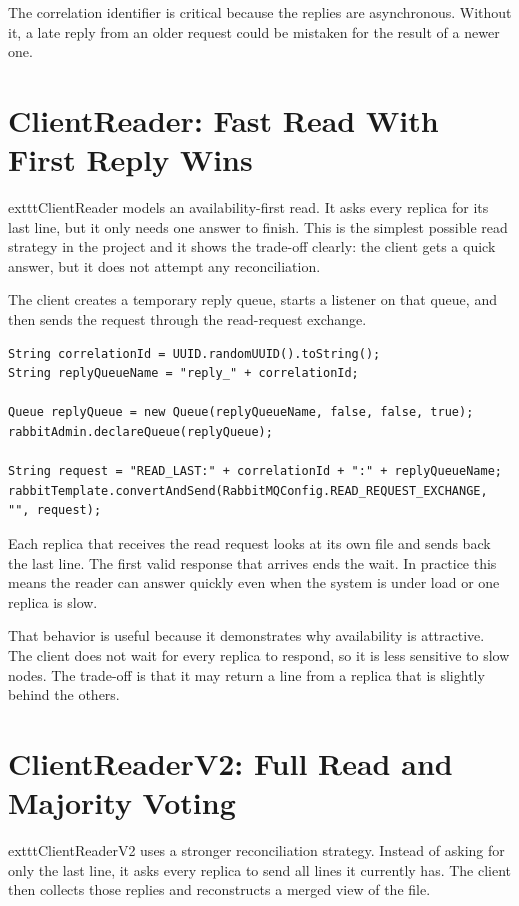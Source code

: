 \documentclass[11pt]{article}
\begin{document}
The correlation identifier is critical because the replies are asynchronous. Without it, a late reply from an older request could be mistaken for the result of a newer one.

\section{ClientReader: Fast Read With First Reply Wins}

	exttt{ClientReader} models an availability-first read. It asks every replica for its last line, but it only needs one answer to finish. This is the simplest possible read strategy in the project and it shows the trade-off clearly: the client gets a quick answer, but it does not attempt any reconciliation.

The client creates a temporary reply queue, starts a listener on that queue, and then sends the request through the read-request exchange.

\begin{lstlisting}
String correlationId = UUID.randomUUID().toString();
String replyQueueName = "reply_" + correlationId;

Queue replyQueue = new Queue(replyQueueName, false, false, true);
rabbitAdmin.declareQueue(replyQueue);

String request = "READ_LAST:" + correlationId + ":" + replyQueueName;
rabbitTemplate.convertAndSend(RabbitMQConfig.READ_REQUEST_EXCHANGE, "", request);
\end{lstlisting}

Each replica that receives the read request looks at its own file and sends back the last line. The first valid response that arrives ends the wait. In practice this means the reader can answer quickly even when the system is under load or one replica is slow.

That behavior is useful because it demonstrates why availability is attractive. The client does not wait for every replica to respond, so it is less sensitive to slow nodes. The trade-off is that it may return a line from a replica that is slightly behind the others.

\section{ClientReaderV2: Full Read and Majority Voting}

	exttt{ClientReaderV2} uses a stronger reconciliation strategy. Instead of asking for only the last line, it asks every replica to send all lines it currently has. The client then collects those replies and reconstructs a merged view of the file.
\end{document}
